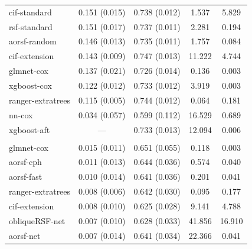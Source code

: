 \documentclass{article}\usepackage[]{graphicx}\usepackage[]{xcolor}
\newenvironment{knitrout}{}{} %
\begin{document}
\begin{knitrout}
\begin{longtable}[t]{lcccc}
\hspace{1em}cif-standard & 0.151 (0.015) & 0.738 (0.012) & 1.537 & 5.829\\
\hspace{1em}rsf-standard & 0.151 (0.017) & 0.737 (0.011) & 2.281 & 0.194\\
\hspace{1em}aorsf-random & 0.146 (0.013) & 0.735 (0.011) & 1.757 & 0.084\\
\hspace{1em}cif-extension & 0.143 (0.009) & 0.747 (0.013) & 11.222 & 4.744\\
\hspace{1em}glmnet-cox & 0.137 (0.021) & 0.726 (0.014) & 0.136 & 0.003\\
\hspace{1em}xgboost-cox & 0.122 (0.012) & 0.733 (0.012) & 3.919 & 0.003\\
\hspace{1em}ranger-extratrees & 0.115 (0.005) & 0.744 (0.012) & 0.064 & 0.181\\
\hspace{1em}nn-cox & 0.034 (0.057) & 0.599 (0.112) & 16.529 & 0.689\\
\hspace{1em}xgboost-aft & --- & 0.733 (0.013) & 12.094 & 0.006\\
\addlinespace[0.3em]
\multicolumn{5}{l}{\textit{\textbf{Monoclonal gammopathy; malignancy, n = 1384, p = 8}}}\\
\hline
\hspace{1em}glmnet-cox & 0.015 (0.011) & 0.651 (0.055) & 0.118 & 0.003\\
\hspace{1em}aorsf-cph & 0.011 (0.013) & 0.644 (0.036) & 0.574 & 0.040\\
\hspace{1em}aorsf-fast & 0.010 (0.014) & 0.641 (0.036) & 0.201 & 0.041\\
\hspace{1em}ranger-extratrees & 0.008 (0.006) & 0.642 (0.030) & 0.095 & 0.177\\
\hspace{1em}cif-extension & 0.008 (0.010) & 0.625 (0.028) & 9.141 & 4.788\\
\hspace{1em}obliqueRSF-net & 0.007 (0.010) & 0.628 (0.033) & 41.856 & 16.910\\
\hspace{1em}aorsf-net & 0.007 (0.014) & 0.641 (0.034) & 22.366 & 0.041\\

\end{longtable}
\end{knitrout}
\end{document}
